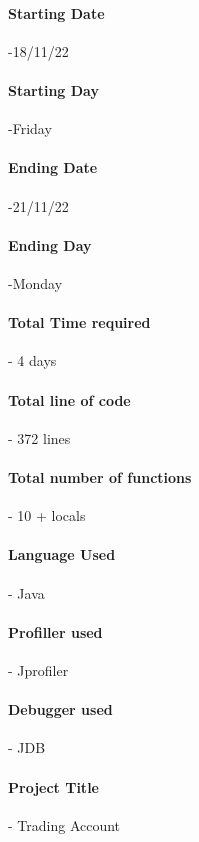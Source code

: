 \documentclass[]{article}
\begin{document}
\paragraph{Starting Date}-\large 18/11/22
\\

\paragraph{Starting Day}-Friday
\\

\paragraph{Ending Date}-21/11/22
\\

\paragraph{Ending Day}-Monday
\\

\paragraph{Total Time required}- 4 days
\\

\paragraph{Total line of code}- 372 lines 
\\

\paragraph{Total number of functions}- 10 + locals
\\
\paragraph{Language Used}- Java
\\
\paragraph{Profiller used}- Jprofiler
\\
\paragraph{Debugger used}- JDB
\\
\paragraph{Project Title}- Trading Account
\\
\end{document}
